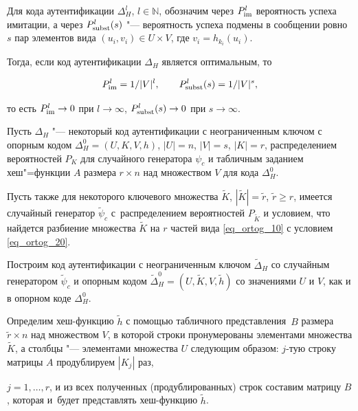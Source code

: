 \vskip 0.1in



Для кода аутентификации $\Delta^l_H$, $l\in \mathbb{N}$, обозначим через $P^l_{\rm im}$ вероятность успеха имитации, а через $P^l_{\rm subst}(s)$ "--- вероятность успеха подмены в сообщении ровно $s$ пар элементов вида $(u_i,v_i)\in U\times V$, где $v_i=h_{k_i}(u_i)$. 

Тогда, если код аутентификации $\Delta_H$ является оптимальным, то

$$

P^l_{\rm im} = {1}/{|V|^l},\qquad  P^l_{\rm subst}(s) = {1}/{|V|^s},

$$

то есть $P^l_{\rm im}\rightarrow 0$ при $l \rightarrow\infty$, $P^l_{\rm subst}(s)\rightarrow 0$ при $s \rightarrow\infty$.





Пусть $\Delta_H$ "--- некоторый код аутентификации с неограниченным ключом с опорным кодом $\Delta_H^0 = (U, K, V, h)$, $|U|=n$, $|V|=s$, $|K|=r$, распределением вероятностей $P_{K}$ для случайного генератора $\psi_c$ и табличным заданием хеш"=функции $A$ размера $r\times n$ над множеством $V$ для кода $\Delta_H^0$. 

Пусть также для некоторого ключевого множества $\widetilde{K}$, $|\widetilde{K}|=\widetilde{r}$, $\widetilde{r}\geq r$, имеется случайный генератор $\widetilde{\psi}_c$ с~распределением вероятностей ${P}_{\widetilde{K}}$ и условием, что найдется разбиение множества $\widetilde{K}$ на $r$ частей вида \eqref{eq_ortog_10} с условием \eqref{eq_ortog_20}.

Построим код аутентификации с неограниченным ключом $\widetilde{\Delta}_H$ со случайным генератором $\widetilde{\psi}_c$ и опорным кодом $\widetilde{\Delta}_H^0 = (U, \widetilde{K}, V, \widetilde{h})$ со значениями $U$ и $V$, как и в  опорном коде $\Delta_H^0$. 

Определим хеш-функцию $\widetilde{h}$ с помощью табличного представления~$B$ размера $\widetilde{r}\times n$ над множеством $V$, в которой строки пронумерованы элементами множества $\widetilde{K}$, а столбцы "--- элементами множества $U$ следующим образом: $j$-тую строку матрицы $A$ продублируем $|K_j|$ раз, 

$j=1,\dots,r$, и из всех полученных (продублированных) строк составим матрицу $B$, которая и~будет представлять хеш-функцию $\widetilde{h}$.





